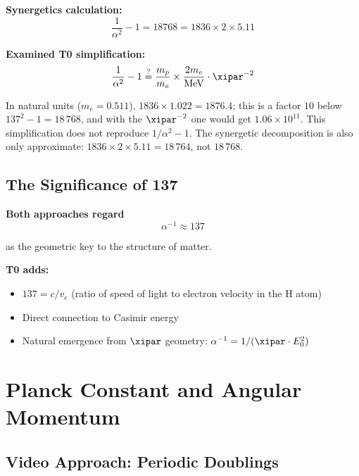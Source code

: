 	\begin{vergleich}
		\textbf{Synergetics calculation:}
		\begin{equation}
			\frac{1}{\alpha^2} - 1 = 18768 = 1836 \times 2 \times 5.11
		\end{equation}
		
		\textbf{Examined T0 simplification:}
		\begin{equation}
			\frac{1}{\alpha^2} - 1 \overset{?}{=} \frac{m_p}{m_e} \times \frac{2m_e}{\text{MeV}} \cdot \xipar^{-2}
		\end{equation}
		
		In natural units ($m_e = 0.511$), $1836 \times 1.022 = 1876.4$; this is a factor $10$ below $137^2-1 = 18\,768$, and with the $\xipar^{-2}$ one would get $1.06\times10^{11}$. This simplification does not reproduce $1/\alpha^2-1$. The synergetic decomposition is also only approximate: $1836\times2\times5.11 = 18\,764$, not $18\,768$.
	\end{vergleich}
	
	\subsection{The Significance of 137}
	
	\begin{gemeinsam}
		\textbf{Both approaches regard}
		\begin{equation}
			\alpha^{-1} \approx 137
		\end{equation}
		
		as the geometric key to the structure of matter.
		
		\textbf{T0 adds:}
		\begin{itemize}
			\item $137 = c/v_e$ (ratio of speed of light to electron velocity in the H atom)
			\item Direct connection to Casimir energy
			\item Natural emergence from $\xipar$ geometry: $\alpha^{-1} = 1/(\xipar \cdot E_0^2)$
		\end{itemize}
	\end{gemeinsam}
	\section{Planck Constant and Angular Momentum}
	
	\subsection{Video Approach: Periodic Doublings}
	
